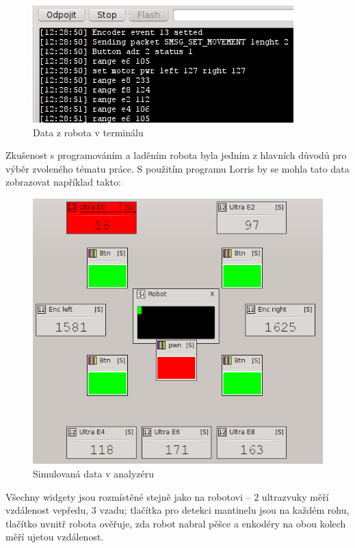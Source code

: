 \documentclass[12pt, a4paper, oneside]{article}
\begin{document}
\begin{figure}[H]
\begin{center}
\includegraphics{img/use_david1.png}
\caption{Data z robota v terminálu}
\end{center}
\end{figure}

Zkušenost s programováním a laděním robota byla jedním z hlavních důvodů pro výběr zvoleného tématu práce. S použitím programu Lorris by se mohla tato data zobrazovat například takto:
\begin{figure}[H]
\begin{center}
\includegraphics{img/use_david2.png}
\caption{Simulovaná data v analyzéru}
\end{center}
\end{figure}

Všechny widgety jsou rozmístěné stejně jako na robotovi -- 2 ultrazvuky měří vzdálenost vepředu, 3 vzadu; tlačítka pro detekci mantinelu jsou na každém rohu, tlačítko uvnitř robota ověřuje,  zda robot nabral pěšce a enkodéry na obou kolech měří ujetou vzdálenost.
\end{document}
